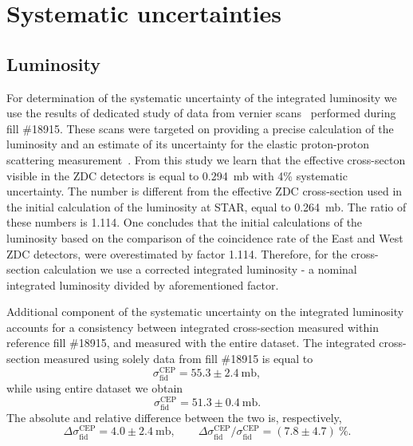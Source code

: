 

\chapter{Systematic uncertainties}\label{chap:systematicErrors} 

\section{Luminosity}\label{sec:lumiSyst}
For determination of the systematic uncertainty of the integrated luminosity we use the results of dedicated study of data from vernier scans~\cite{lumiNote} performed during fill \#18915. These scans were targeted on providing a precise calculation of the luminosity and an estimate of its uncertainty for the elastic proton-proton scattering measurement~\cite{elasticNote}. From this study we learn that the effective cross-secton visible in the ZDC detectors is equal to 0.294~mb with 4\% systematic uncertainty. The number is different from the effective ZDC cross-section used in the initial calculation of the luminosity at STAR, equal to 0.264~mb. The ratio of these numbers is 1.114. One concludes that the initial calculations of the luminosity based on the comparison of the coincidence rate of the East and West ZDC detectors, were overestimated by factor 1.114. Therefore, for the cross-section calculation we use a corrected integrated luminosity - a nominal integrated luminosity divided by aforementioned factor.

Additional component of the systematic uncertainty on the integrated luminosity accounts for a consistency between integrated cross-section measured within reference fill \#18915, and measured with the entire dataset. The integrated cross-section measured using solely data from fill \#18915 is equal to
\begin{equation}
 \sigma_{\text{fid}}^{\text{CEP}} = 55.3\pm2.4~\text{mb},
\end{equation}
while using entire dataset we obtain
\begin{equation}
 \sigma_{\text{fid}}^{\text{CEP}} = 51.3\pm0.4~\text{mb}.
\end{equation}
The absolute and relative difference between the two is, respectively,
\begin{equation}
 \Delta\sigma_{\text{fid}}^{\text{CEP}} = 4.0\pm2.4~\text{mb},~~~~~~~~~\Delta\sigma_{\text{fid}}^{\text{CEP}}/\sigma_{\text{fid}}^{\text{CEP}} = \left(7.8\pm4.7\right)~\%.
\end{equation}

